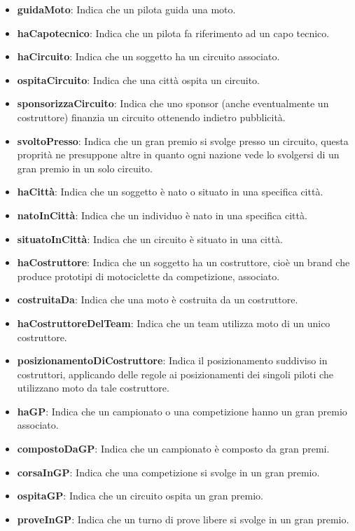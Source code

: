 \begin{itemize}
    \item \textbf{guidaMoto}: Indica che un pilota guida una moto.
    \item \textbf{haCapotecnico}: Indica che un pilota fa riferimento ad un capo tecnico.
    
\item \textbf{haCircuito}: Indica che un soggetto ha un circuito associato.
    \item \textbf{ospitaCircuito}: Indica che una città ospita un circuito.
    \item \textbf{sponsorizzaCircuito}: Indica che uno sponsor (anche eventualmente un costruttore) finanzia un circuito ottenendo indietro pubblicità.
    \item \textbf{svoltoPresso}: Indica che un gran premio si svolge presso un circuito, questa proprità ne presuppone altre in quanto ogni nazione vede lo svolgersi di un gran premio in un solo circuito.
	
	\item \textbf{haCittà}: Indica che un soggetto è nato o situato in una specifica città.
    \item \textbf{natoInCittà}: Indica che un individuo è nato in una specifica città.
    \item \textbf{situatoInCittà}: Indica che un circuito è situato in una città.
	
	
    \item \textbf{haCostruttore}: Indica che un soggetto ha un costruttore, cioè un brand che produce prototipi di motociclette da competizione, associato.
    \item \textbf{costruitaDa}: Indica che una moto è costruita da un costruttore.
    \item \textbf{haCostruttoreDelTeam}: Indica che un team utilizza moto di un unico costruttore.
    \item \textbf{posizionamentoDiCostruttore}: Indica il posizionamento suddiviso in costruttori, applicando delle regole ai posizionamenti dei singoli piloti che utilizzano moto da tale costruttore.
	
    \item \textbf{haGP}: Indica che un campionato o una competizione hanno un gran premio associato.
    \item \textbf{compostoDaGP}: Indica che un campionato è composto da gran premi.
    \item \textbf{corsaInGP}: Indica che una competizione si svolge in un gran premio.
    \item \textbf{ospitaGP}: Indica che un circuito ospita un gran premio.
    \item \textbf{proveInGP}: Indica che un turno di prove libere si svolge in un gran premio.
	

\end{itemize}
